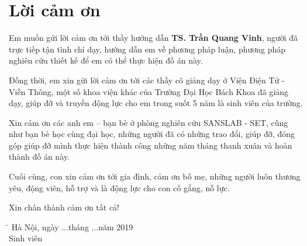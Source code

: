 \thispagestyle{plain}
\chapter*{Lời cảm ơn}

Em muốn gửi lời cảm ơn tới thầy hướng dẫn \textbf{TS. Trần Quang Vinh}, người đã trực tiếp tận tình chỉ dạy, hướng dẫn em về phương pháp luận, phương pháp nghiên cứu thiết kế để em có thể thực hiện đồ án này.\par
	Đồng thời, em xin gửi lời cảm ơn tới các thầy cô giảng dạy ở Viện Điện Tử - Viễn Thông, một số khoa viện khác của Trường Đại Học Bách Khoa đã giảng dạy, giúp đỡ và truyền động lực cho em trong suốt 5 năm là sinh viên của trường. \par
	Xin cảm ơn các anh em – bạn bè ở phòng nghiên cứu SANSLAB - SET, cũng như bạn bè học cùng đại học, những người đã có những trao đổi, giúp đỡ, đóng góp giúp đỡ mình thực hiện thành công những năm tháng thanh xuân và hoàn thành đồ án này. \par
	Cuối cùng, con xin cảm ơn tới gia đình, cảm ơn bố mẹ, những người luôn thương yêu, động viên, hỗ trợ và là động lực cho con cố gắng, nỗ lực.  \par

Xin chân thành cảm ơn tất cả! \par

           

 
  \begin{tabbing}
 \hspace{9cm}\=\kill
   \> Hà Nội, ngày ...tháng ...năm 2019 \\ 
   \>  \hspace{1.5cm}    Sinh viên\\ 
 \end{tabbing}